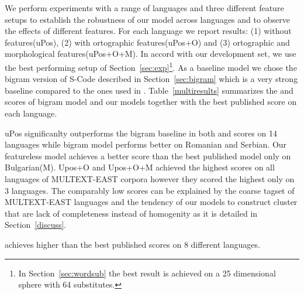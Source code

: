 We perform experiments with a range of languages and three different
feature setups to establish the robustness of our model across
languages and to observe the effects of different features.  For each
language we report results: (1) without features(uPos), (2) with
ortographic features(uPos+O) and (3) ortographic and morphological
features(uPos+O+M).  In accord with our development set, we use the
best performing setup of Section~\ref{sec:exp}\footnote{In
  Section~\ref{sec:wordsub} the best result is achieved on a 25
  dimensional sphere with 64 substitutes.}.  As a baseline model we
chose the bigram version of S-Code described in
Section~\ref{sec:bigram} which is a very strong baseline compared to
the ones used in \cite{christodoulopoulos-goldwater-steedman}.
Table~\ref{multiresults} summarizes the \mto and \vm scores of bigram
model and our models together with the best published score on each
language.  

uPos significanlty outperforms the bigram baseline in both \mto and
\vm scores on 14 languages while bigram model performs better on
Romanian and Serbian.  Our featureless model achieves a better \mto
score than the best published model only on Bulgarian(M).  Upos+O and
Upos+O+M achieved the highest \mto scores on all languages of
MULTEXT-EAST corpora however they scored the highest \vm only on 3
languages.  The comparably low \vm scores can be explained by the
coarse tagset of MULTEXT-EAST languages and the tendency of our models
to construct cluster that are lack of completeness instead of
homogenity as it is detailed in Section~\ref{discuss}.


achieves higher \mto than the best published scores on 8 different
languages.

